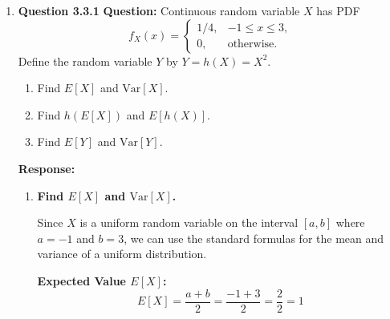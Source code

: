 \documentclass[12pt]{article}
\begin{document}
\begin{enumerate}[label=\textbf{\arabic*.}, leftmargin=*]
\textbf{For $-5 \le w < -3$:}
\[ F_W(w) = \frac{w + 5}{8} = \frac{1}{8}w + \frac{5}{8} \]
\[ f_W(w) = \frac{d}{dw}\left(\frac{1}{8}w + \frac{5}{8}\right) = \frac{1}{8} \]

\textbf{For $-3 \le w < 3$:}
\[ F_W(w) = \frac{1}{4} \]
\[ f_W(w) = \frac{d}{dw}\left(\frac{1}{4}\right) = 0 \]

\textbf{For $3 \le w < 5$:}
\[ F_W(w) = \frac{1}{4} + \frac{3(w - 3)}{8} = \frac{1}{4} + \frac{3}{8}w - \frac{9}{8} \]
\[ f_W(w) = \frac{d}{dw}\left(\frac{3}{8}w + \text{constant}\right) = \frac{3}{8} \]

\textbf{For $w \ge 5$:}
\[ F_W(w) = 1 \implies f_W(w) = 0 \]

\textbf{Answer:}
The PDF is:
\[
f_W(w) =
\begin{cases}
\frac{1}{8}, & -5 \le w < -3, \\
0, & -3 \le w < 3, \\
\frac{3}{8}, & 3 \le w < 5, \\
0, & \text{otherwise.}
\end{cases}
\]

\newpage
\item \textbf{Question 3.3.1}
\textbf{Question:} Continuous random variable $X$ has PDF
\[
f_X(x) = \begin{cases}
1/4, & -1 \le x \le 3, \\
0, & \text{otherwise.}
\end{cases}
\]
Define the random variable $Y$ by $Y = h(X) = X^2$.
\begin{enumerate}[label=(\alph*)]
    \item Find $E[X]$ and $\text{Var}[X]$.
    \item Find $h(E[X])$ and $E[h(X)]$.
    \item Find $E[Y]$ and $\text{Var}[Y]$.
\end{enumerate}

\vspace{0.3in}

\textbf{Response:}

\begin{enumerate}[label=(\alph*)]
    \item \textbf{Find $E[X]$ and $\text{Var}[X]$.}

    Since $X$ is a uniform random variable on the interval $[a, b]$ where $a = -1$ and $b = 3$, we can use the standard formulas for the mean and variance of a uniform distribution.

    \textbf{Expected Value $E[X]$:}
    \[ E[X] = \frac{a + b}{2} = \frac{-1 + 3}{2} = \frac{2}{2} = 1 \]


\end{enumerate}
\end{enumerate}
\end{document}
